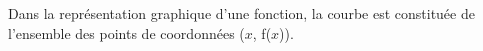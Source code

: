 Dans la représentation graphique d'une fonction, la courbe est constituée de
l'ensemble des points de coordonnées ($x$, f($x$)).